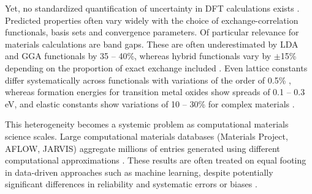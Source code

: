 \documentclass[prb,twocolumn,superscriptaddress,amsmath,amssymb,longbibliography]{revtex4-2}
\begin{document}
Yet, no standardized quantification of uncertainty in DFT calculations exists \cite{Burke2012}. Predicted properties often vary widely with the choice of exchange-correlation functionals, basis sets and convergence parameters. Of particular relevance for materials calculations are band gaps. These are often underestimated by LDA and GGA functionals by 
35 -- 40\%, whereas hybrid functionals vary by $\pm$15\% 
depending on the proportion of exact exchange included \cite{Borlido2019,Heyd2003_HSE}.  Even lattice constants differ systematically across functionals with variations of the order of 0.5\% 
\cite{Lejaeghere2016,Haas2009}, whereas formation energies for transition metal oxides show spreads of 0.1 -- 0.3 eV\cite{Kingsbury2022,Stevanovic2012_FERE}, and elastic constants show variations of 10 -- 30\%  for complex materials 
\cite{deJong2015}.

This heterogeneity becomes a systemic problem as computational materials 
science scales. Large computational materials databases (Materials Project, AFLOW, JARVIS) aggregate millions of entries generated using different computational approximations \cite{Jain2013, Curtarolo2012,Choudhary2020,Kirklin2015_OQMD,Draxl2019_NOMAD,Andersen2021_OPTIMADE}. These results are often treated on equal footing in data-driven approaches such as machine learning, despite potentially significant differences in reliability and systematic errors or biases \cite{Bartel2020_critical_ML}.    
\end{document}
